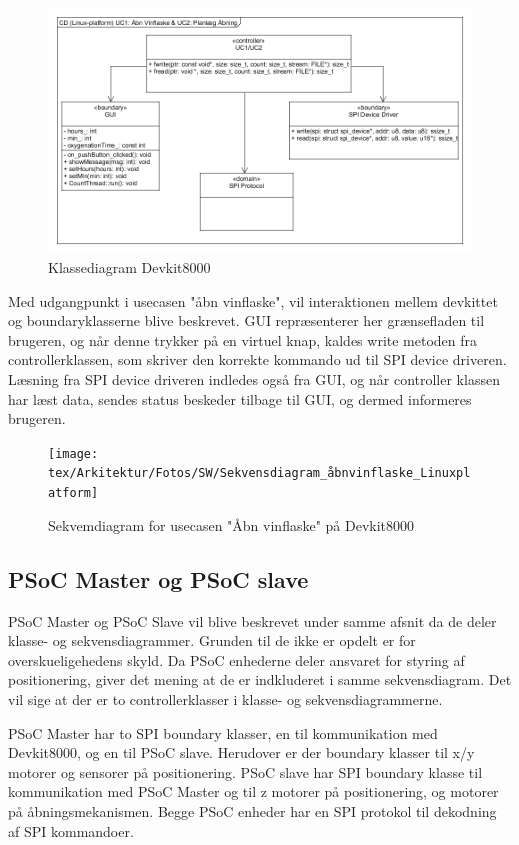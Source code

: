 \begin{figure}[H]
\includegraphics[scale=0.4]{tex/Arkitektur/Fotos/SW/Klassediagram_Linuxplatform}
\caption{Klassediagram Devkit8000}
\end{figure}

Med udgangpunkt i usecasen "åbn vinflaske", vil interaktionen mellem devkittet og boundaryklasserne blive beskrevet. 
GUI repræsenterer her grænsefladen til brugeren, og når denne trykker på en virtuel knap, kaldes write metoden fra controllerklassen, som skriver den korrekte 
kommando ud til SPI device driveren. Læsning fra SPI device driveren indledes også fra GUI, og når controller klassen har læst data, sendes status beskeder 
tilbage til GUI, og dermed informeres brugeren.\\

\begin{figure}[H]
\texttt{[image: tex/Arkitektur/Fotos/SW/Sekvensdiagram\_åbnvinflaske\_Linuxplatform]}
\caption{Sekvemdiagram for usecasen "Åbn vinflaske" på Devkit8000}
\end{figure}

\subsection{PSoC Master og PSoC slave}
PSoC Master og PSoC Slave vil blive beskrevet under samme afsnit da de deler klasse- og sekvensdiagrammer. 
Grunden til de ikke er opdelt er for overskueligehedens skyld. Da PSoC enhederne deler ansvaret for styring af positionering, giver det mening at de er 
indkluderet i samme sekvensdiagram. Det vil sige at der er to controllerklasser i klasse- og sekvensdiagrammerne. 

PSoC Master har to SPI boundary klasser, en til kommunikation med Devkit8000, og en til PSoC slave. Herudover er der boundary klasser til x/y motorer og 
sensorer på positionering. 
PSoC slave har SPI boundary klasse til kommunikation med PSoC Master og til z motorer på positionering, og motorer på åbningsmekanismen. Begge PSoC enheder har
en SPI protokol til dekodning af SPI kommandoer.\\

